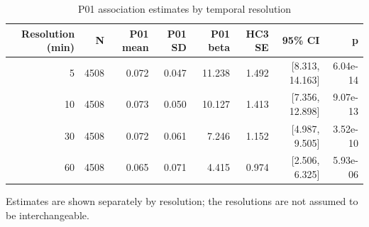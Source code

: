 \begin{table}[!htbp]
\centering
\small
\caption{P01 association estimates by temporal resolution}
\label{tab:tableS2_resolution_sensitivity}
\begin{tabular}{rrrrrrrr}
\hline
Resolution (min) & N & P01 mean & P01 SD & P01 beta & HC3 SE & 95\% CI & p \\
\hline
5 & 4508 & 0.072 & 0.047 & 11.238 & 1.492 & [8.313, 14.163] & 6.04e-14 \\
10 & 4508 & 0.073 & 0.050 & 10.127 & 1.413 & [7.356, 12.898] & 9.07e-13 \\
30 & 4508 & 0.072 & 0.061 & 7.246 & 1.152 & [4.987, 9.505] & 3.52e-10 \\
60 & 4508 & 0.065 & 0.071 & 4.415 & 0.974 & [2.506, 6.325] & 5.93e-06 \\
\hline
\end{tabular}
\vspace{2pt}
\begin{minipage}{\linewidth}\footnotesize
Estimates are shown separately by resolution; the resolutions are not assumed to be interchangeable.
\end{minipage}
\end{table}
